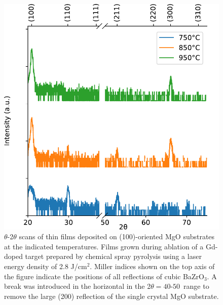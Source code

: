 \begin{figure}
    \centering
    \includegraphics{Figures/180316-thin-film-2thetaOmega-sym-logplot-broken-axes-indexed-edit-2.pdf}
    \caption{$\theta$-2$\theta$ scans of thin films deposited on (100)-oriented MgO substrates at the indicated temperatures. Films grown during ablation of a Gd-doped target prepared by chemical spray pyrolysis using a laser energy density of 2.8 J/cm$^2$. Miller indices shown on the top axis of the figure indicate the positions of all reflections of cubic BaZrO$_3$. A break was introduced in the horizontal in the 2$\theta= 40$-$50$\textdegree\ range to remove the large (200) reflection of the single crystal MgO substrate.}
    \label{fig:films:xrd:2thetaOmega:brokenAxis}
\end{figure}

